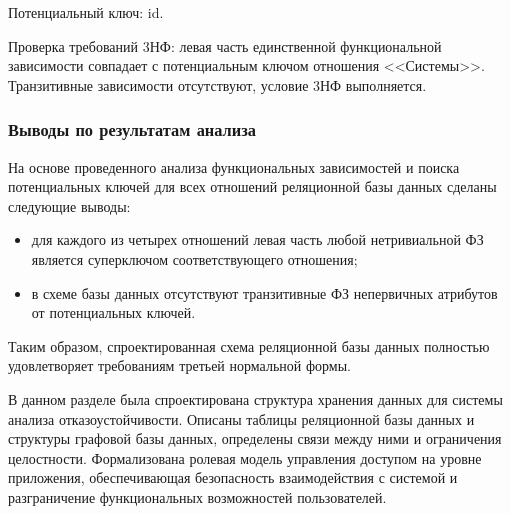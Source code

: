 Потенциальный ключ: id.

Проверка требований 3НФ: левая часть единственной функциональной зависимости 
совпадает с потенциальным ключом отношения <<Системы>>. 
Транзитивные зависимости отсутствуют, условие 3НФ выполняется.

\subsubsection{Выводы по результатам анализа}
На основе проведенного анализа функциональных зависимостей и поиска потенциальных ключей 
для всех отношений реляционной базы данных сделаны следующие выводы:
\begin{itemize}
    \item для каждого из четырех отношений левая часть любой нетривиальной ФЗ является суперключом соответствующего отношения;
    \item в схеме базы данных отсутствуют транзитивные ФЗ непервичных атрибутов от потенциальных ключей.
\end{itemize}

Таким образом, спроектированная схема реляционной базы данных полностью удовлетворяет требованиям третьей нормальной формы.

В данном разделе была спроектирована структура хранения данных для системы анализа
отказоустойчивости. Описаны таблицы реляционной базы данных и структуры графовой
базы данных, определены связи между ними и ограничения целостности. Формализована ролевая
модель управления доступом на уровне приложения, обеспечивающая безопасность
взаимодействия с системой и разграничение функциональных возможностей пользователей.
